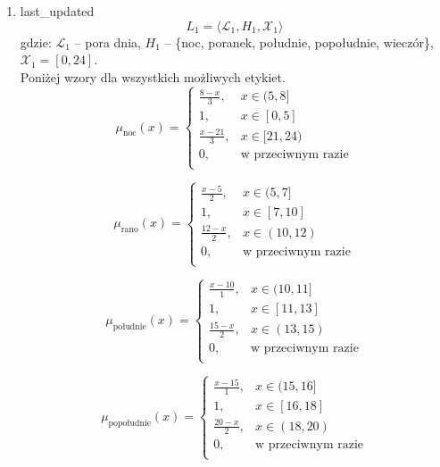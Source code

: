 \documentclass{article}
\begin{document}
\begin{enumerate}
    \item last\_updated
        \begin{equation}
            L_1 = \langle \mathcal{L}_1, H_1, \mathcal{X}_1 \rangle
        \end{equation}
        gdzie: $\mathcal{L}_1$ – pora dnia, $H_1$ – \{noc, poranek, południe, popołudnie, wieczór\}, $\mathcal{X}_1 = [0, 24]$. \\
        Poniżej wzory dla wszystkich możliwych etykiet.
        \begin{equation}
            \mu_{\text{noc}}(x) =
            \begin{cases}
            \frac{8 - x}{3}, & x \in (5, 8] \\
            1, & x \in [0, 5] \\
            \frac{x - 21}{3}, & x \in [21, 24) \\
            0, & \text{w przeciwnym razie} \\
            \end{cases}
        \end{equation}

        \begin{equation}
            \mu_{\text{rano}}(x) =
            \begin{cases}
            \frac{x - 5}{2}, & x \in (5, 7] \\
            1, & x \in [7, 10] \\
            \frac{12 - x}{2}, & x \in (10, 12) \\
            0, & \text{w przeciwnym razie} \\
            \end{cases}
        \end{equation}

        \begin{equation}
            \mu_{\text{południe}}(x) =
            \begin{cases}
            \frac{x - 10}{1}, & x \in (10, 11] \\
            1, & x \in [11, 13] \\
            \frac{15 - x}{2}, & x \in (13, 15) \\
            0, & \text{w przeciwnym razie} \\
            \end{cases}
        \end{equation}

        \begin{equation}
            \mu_{\text{popołudnie}}(x) =
            \begin{cases}
            \frac{x - 15}{1}, & x \in (15, 16] \\
            1, & x \in [16, 18] \\
            \frac{20 - x}{2}, & x \in (18, 20) \\
            0, & \text{w przeciwnym razie} \\
             \end{cases}
        \end{equation}


\end{enumerate}
\end{document}
